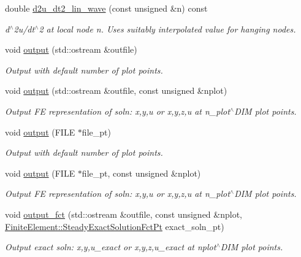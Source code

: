 \begin{DoxyCompactItemize}
double \hyperlink{classoomph_1_1LinearWaveEquations_ac249d0568e64e09da880f7b1b0f80cdd}{d2u\+\_\+dt2\+\_\+lin\+\_\+wave} (const unsigned \&n) const
\begin{DoxyCompactList}\small\item\em d$^\wedge$2u/dt$^\wedge$2 at local node n. Uses suitably interpolated value for hanging nodes. \end{DoxyCompactList}\item 
void \hyperlink{classoomph_1_1LinearWaveEquations_ad5d68d2b3ec9fe3c6102ae91b9c61cc6}{output} (std\+::ostream \&outfile)
\begin{DoxyCompactList}\small\item\em Output with default number of plot points. \end{DoxyCompactList}\item 
void \hyperlink{classoomph_1_1LinearWaveEquations_a1830b4405d4ab215e91e01914dd426f3}{output} (std\+::ostream \&outfile, const unsigned \&nplot)
\begin{DoxyCompactList}\small\item\em Output FE representation of soln\+: x,y,u or x,y,z,u at n\+\_\+plot$^\wedge$\+D\+IM plot points. \end{DoxyCompactList}\item 
void \hyperlink{classoomph_1_1LinearWaveEquations_a7a1464dbadf5fb3542979951b389694b}{output} (F\+I\+LE $\ast$file\+\_\+pt)
\begin{DoxyCompactList}\small\item\em Output with default number of plot points. \end{DoxyCompactList}\item 
void \hyperlink{classoomph_1_1LinearWaveEquations_a2e3dd0d7c46d095fea74969c3648f0ca}{output} (F\+I\+LE $\ast$file\+\_\+pt, const unsigned \&nplot)
\begin{DoxyCompactList}\small\item\em Output FE representation of soln\+: x,y,u or x,y,z,u at n\+\_\+plot$^\wedge$\+D\+IM plot points. \end{DoxyCompactList}\item 
void \hyperlink{classoomph_1_1LinearWaveEquations_a3ae24c98f2d190e56fe24e754de682d8}{output\+\_\+fct} (std\+::ostream \&outfile, const unsigned \&nplot, \hyperlink{classoomph_1_1FiniteElement_a690fd33af26cc3e84f39bba6d5a85202}{Finite\+Element\+::\+Steady\+Exact\+Solution\+Fct\+Pt} exact\+\_\+soln\+\_\+pt)
\begin{DoxyCompactList}\small\item\em Output exact soln\+: x,y,u\+\_\+exact or x,y,z,u\+\_\+exact at nplot$^\wedge$\+D\+IM plot points. \end{DoxyCompactList}\item 

\end{DoxyCompactItemize}
